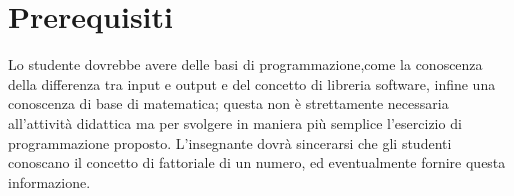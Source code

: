 \section{Prerequisiti}
Lo studente dovrebbe avere delle basi di programmazione,come la conoscenza della differenza tra input e output e del concetto di libreria software, infine una conoscenza di  base di matematica; questa non è strettamente necessaria all'attività didattica ma per svolgere in maniera più semplice l'esercizio di programmazione proposto. L'insegnante dovrà sincerarsi che gli studenti conoscano il concetto di fattoriale di un numero, ed eventualmente fornire questa informazione. 